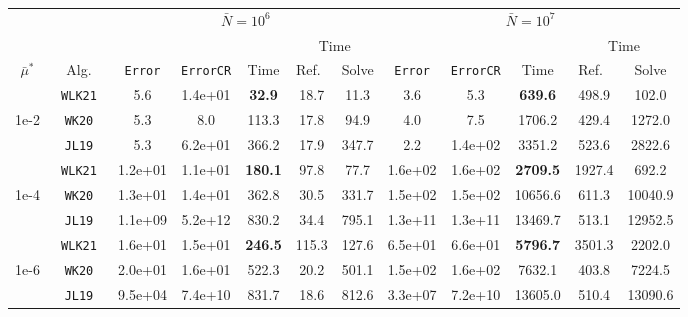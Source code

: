 \begin{tabular}{ccccccc|ccccc}%
\toprule
& & \multicolumn{5}{c}{$\bar N = 10^6$} & \multicolumn{5}{c}{$\bar N = 10^7$} \\
\cmidrule(lr){3-7} \cmidrule(lr){8-12}
& & & & & \multicolumn{2}{c}{Time} & & & & \multicolumn{2}{c}{Time} \\
\cmidrule(lr){6-7} \cmidrule(lr){11-12}
$\bar\mu^*$   & Alg.        & \texttt{Error} & \texttt{ErrorCR} & Time      & Ref.\ & Solve & \texttt{Error} & \texttt{ErrorCR} & Time     & Ref.\  & Solve \\
\midrule
& \texttt{ WLK21 }&  5.6&  1.4e+01& \textbf{ 32.9 }&  18.7&  11.3&  3.6&  5.3& \textbf{ 639.6 }&  498.9&  102.0 \\
1e-2& \texttt{ WK20 }&  5.3&  8.0&  113.3&  17.8&  94.9&  4.0&  7.5&  1706.2&  429.4&  1272.0 \\
& \texttt{ JL19 }&  5.3&  6.2e+01&  366.2&  17.9&  347.7&  2.2&  1.4e+02&  3351.2&  523.6&  2822.6 \\
\midrule
& \texttt{ WLK21 }&  1.2e+01&  1.1e+01& \textbf{ 180.1 }&  97.8&  77.7&  1.6e+02&  1.6e+02& \textbf{ 2709.5 }&  1927.4&  692.2 \\
1e-4& \texttt{ WK20 }&  1.3e+01&  1.4e+01&  362.8&  30.5&  331.7&  1.5e+02&  1.5e+02&  10656.6&  611.3&  10040.9 \\
& \texttt{ JL19 }&  1.1e+09&  5.2e+12&  830.2&  34.4&  795.1&  1.3e+11&  1.3e+11&  13469.7&  513.1&  12952.5 \\
\midrule
& \texttt{ WLK21 }&  1.6e+01&  1.5e+01& \textbf{ 246.5 }&  115.3&  127.6&  6.5e+01&  6.6e+01& \textbf{ 5796.7 }&  3501.3&  2202.0 \\
1e-6& \texttt{ WK20 }&  2.0e+01&  1.6e+01&  522.3&  20.2&  501.1&  1.5e+02&  1.6e+02&  7632.1&  403.8&  7224.5 \\
& \texttt{ JL19 }&  9.5e+04&  7.4e+10&  831.7&  18.6&  812.6&  3.3e+07&  7.2e+10&  13605.0&  510.4&  13090.6 \\
\bottomrule
\end{tabular}
